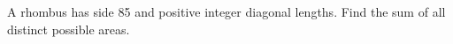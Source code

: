 A rhombus has side 85 and positive integer diagonal lengths. Find the sum of all distinct possible areas.
